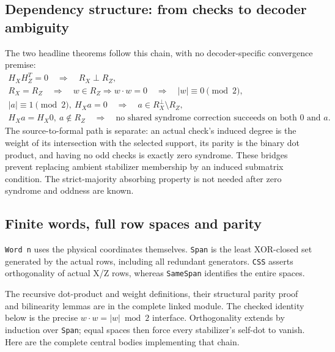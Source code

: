 \subsection{Dependency structure: from checks to decoder ambiguity}
The two headline theorems follow this chain, with no decoder-specific convergence premise:
\[
\begin{gathered}
 H_XH_Z^T=0\quad\Longrightarrow\quad R_X\perp R_Z,\\
 R_X=R_Z\quad\Longrightarrow\quad w\in R_Z\Rightarrow w\cdot w=0
 \quad\Longrightarrow\quad |w|\equiv0\pmod2,\\
 |a|\equiv1\pmod2,\ H_Xa=0\quad\Longrightarrow\quad
 a\in R_X^\perp\setminus R_Z,\\
 H_Xa=H_X0,\ a\notin R_Z\quad\Longrightarrow\quad
 \text{no shared syndrome correction succeeds on both }0\text{ and }a.
\end{gathered}
\]
The source-to-formal path is separate: an actual check's induced degree is the weight of its intersection with the selected support, its parity is the binary dot product, and having no odd checks is exactly zero syndrome. These bridges prevent replacing ambient stabilizer membership by an induced submatrix condition. The strict-majority absorbing property is not needed after zero syndrome and oddness are known.

\subsection{Finite words, full row spaces and parity}
\texttt{Word n} uses the physical coordinates themselves. \texttt{Span} is the least XOR-closed set generated by the actual rows, including all redundant generators. \texttt{CSS} asserts orthogonality of actual X/Z rows, whereas \texttt{SameSpan} identifies the entire spaces.







The recursive dot-product and weight definitions, their structural parity proof and bilinearity lemmas are in the complete linked module. The checked identity below is the precise $w\cdot w=|w|\bmod2$ interface. Orthogonality extends by induction over \texttt{Span}; equal spaces then force every stabilizer's self-dot to vanish. Here are the complete central bodies implementing that chain.





